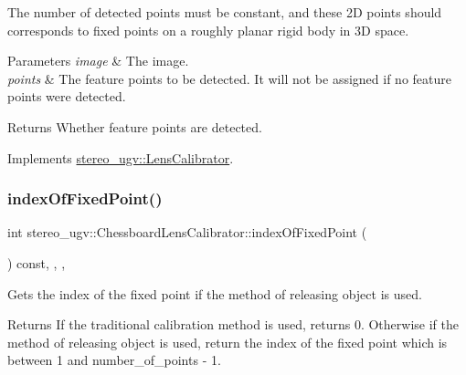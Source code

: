 The number of detected points must be constant, and these 2D points should corresponds to fixed points on a roughly planar rigid body in 3D space. 
\begin{DoxyParams}{Parameters}
{\em image} & The image. \\
\hline
{\em points} & The feature points to be detected. It will not be assigned if no feature points were detected. \\
\hline
\end{DoxyParams}
\begin{DoxyReturn}{Returns}
Whether feature points are detected. 
\end{DoxyReturn}


Implements \hyperlink{classstereo__ugv_1_1LensCalibrator_a9be834b0ef2983af47ac5f9dd67887fe}{stereo\+\_\+ugv\+::\+Lens\+Calibrator}.

\mbox{\label{classstereo__ugv_1_1ChessboardLensCalibrator_a00aa88f3399b59ec686f6d506c73a910}} 
\subsubsection{\texorpdfstring{index\+Of\+Fixed\+Point()}{indexOfFixedPoint()}}
{\footnotesize\ttfamily int stereo\+\_\+ugv\+::\+Chessboard\+Lens\+Calibrator\+::index\+Of\+Fixed\+Point (\begin{DoxyParamCaption}{ }\end{DoxyParamCaption}) const\hspace{0.3cm}{\ttfamily [override]}, {\ttfamily [protected]}, {\ttfamily [virtual]}, {\ttfamily [noexcept]}}



Gets the index of the fixed point if the method of releasing object is used. 

\begin{DoxyReturn}{Returns}
If the traditional calibration method is used, returns 0. Otherwise if the method of releasing object is used, return the index of the fixed point which is between 1 and number\+\_\+of\+\_\+points -\/ 1. 
\end{DoxyReturn}


